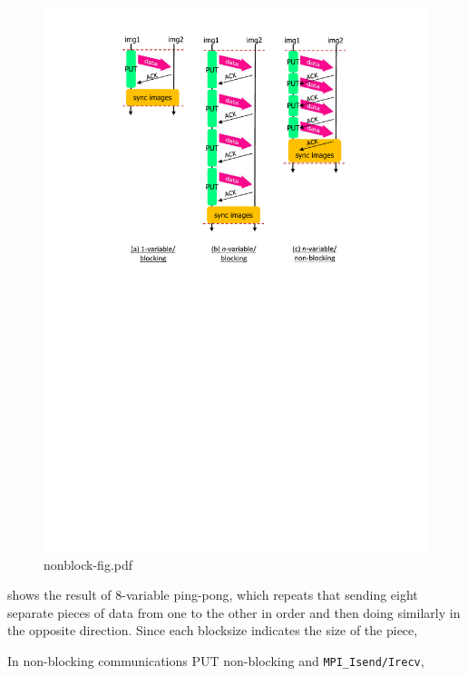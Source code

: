 \begin{figure}[tbh]
  \begin{center}
    \mbox{\includegraphics[trim=43mm 144mm 43mm 3mm, scale=0.6,clip]{figs/nonblock-fig-r2.pdf}}
    \caption{nonblock-fig.pdf}\label{fig:nonblock-fig}
  \end{center}
\end{figure}


 shows the result of 8-variable ping-pong, which repeats
that sending eight separate pieces of data from one to the other in order 
and then doing similarly in the opposite direction.
Since each blocksize indicates the size of the piece, 

In non-blocking communications PUT non-blocking and {\tt MPI\_Isend/Irecv},


